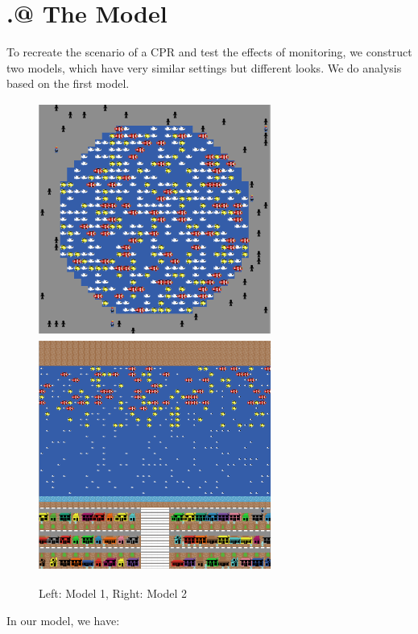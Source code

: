 \documentclass[12pt]{article}
\makeatletter
\newcommand{\Rmnum}[1]{\expandafter\@slowromancap\romannumeral #1@}
\makeatother
\begin{document}
\section{\Rmnum{2.} The Model}
To recreate the scenario of a CPR and test the effects of monitoring, we construct two models, which have very similar settings but different looks. We do analysis based on the first model.
\begin{figure}[!h]
\caption{Left: Model 1, Right: Model 2}
\includegraphics[width=3in,height=3in]{model1}
\includegraphics[width=3in,height=3in]{model2}
\end{figure}
\newpage
In our model, we have:
\end{document}
